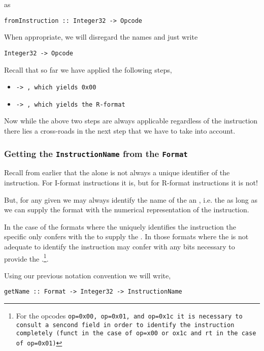 as

\begin{verbatim}
fromInstruction :: Integer32 -> Opcode
\end{verbatim}

When appropriate, we will disregard the names and just write

\begin{verbatim}
Integer32 -> Opcode
\end{verbatim}

Recall that so far we have applied the following steps,

\begin{itemize}
\item \tt{\integer -> \opcode}, which yields \tt{0x00}
\item \tt{\opcode -> \format}, which yields the R-format
\end{itemize}

Now while the above two steps are always applicable regardless of the instruction
there lies a cross-roads in the next step that we have to take into account.

\subsubsection{Getting the \texttt{InstructionName} from the \texttt{Format}}

Recall from earlier that the \opcode alone is not always a unique identifier of
the instruction. For I-format instructions it is, but for R-format instructions
it is not!

But, for any given \formatm we may always identify the name of the
an \instructionm, i.e. the \inamem as long as we can supply the format
with the numerical representation of the instruction.

In the case of the formats where the \opcodem uniquely identifies the
instruction the specific \formatm only confers with the \opcodem to
supply the \inamem. In those formats where the \opcodem is not
adequate to identify the instruction \formatm may confer with any bits
necessary to provide the \inamem.\footnote{For the opcodes \tt{op=0x00}, \tt{op=0x01},
and \tt{op=0x1c} it is necessary to consult a sencond field in order to identify
the instruction completely (\tt{funct} in the case of \tt{op=x00} or \tt{ox1c} and
\tt{rt} in the case of \tt{op=0x01})}.

Using our previous notation convention we will write,

\begin{verbatim}
getName :: Format -> Integer32 -> InstructionName
\end{verbatim}

